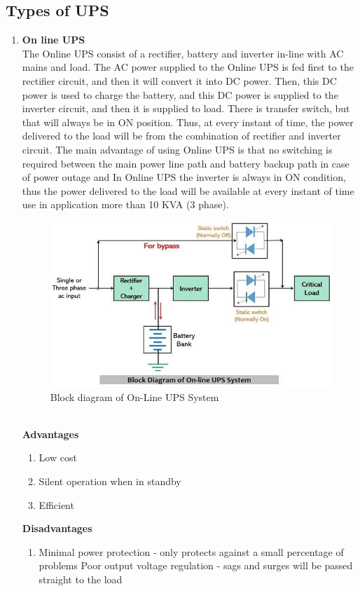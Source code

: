 \documentclass[12pt,fleqn]{book} %
\begin{document}
\subsection{Types of UPS}
\begin{enumerate}
    \item \textbf{On line UPS}
    \\ The Online UPS consist of a rectifier, battery and inverter in-line with AC mains and load. The AC power supplied to the Online UPS is fed first to the rectifier circuit, and then it will convert it into DC power. Then, this DC power is used to charge the battery, and this DC power is supplied to the inverter circuit, and then it is supplied to load. There is transfer switch, but that will always be in ON position. Thus, at every instant of time, the power delivered to the load will be from the combination of rectifier and inverter circuit. The main advantage of using Online UPS is that no switching is required between the main power line path and battery backup path in case of power outage and In Online UPS the inverter is always in ON condition, thus the power delivered to the load will be available at every instant of time use in application more than 10 KVA (3 phase).
    \begin{figure}[h!]
    \centering
    \includegraphics[width=0.8\linewidth]{hamdy 12.png}
    \caption{Block diagram of On-Line UPS System}
    \label{fig:hamdy 12}
\end{figure} 
\\ \textbf{Advantages}
\begin{enumerate}
    \item Low cost
    \item Silent operation when in standby
    \item Efficient
\end{enumerate}
\textbf{Disadvantages}
\begin{enumerate}
    \item Minimal power protection - only protects against a small percentage of problems Poor output voltage regulation - sags and surges will be passed straight to the load

\end{enumerate}
\end{enumerate}
\end{document}
